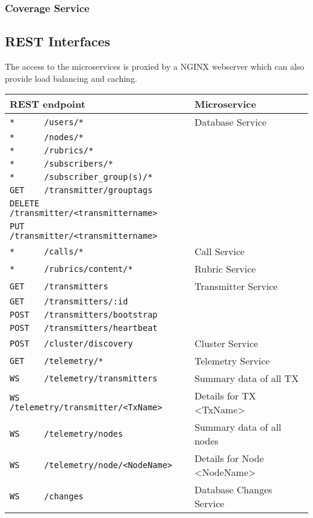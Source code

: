 \subsubsection{Coverage Service}
\label{internalprog:microservices:overview:coverage}




\subsection{REST Interfaces}
The access to the microservices is proxied by a NGINX webserver which can also provide load balancing and caching.

\begin{center}
  \begin{tabular}{|l|l|} \hline
    REST endpoint & Microservice \\ \hline \hline

    \verb|*      /users/*| & Database Service \\
    \verb|*      /nodes/*| &  \\
    \verb|*      /rubrics/*| &  \\
    \verb|*      /subscribers/*| & \\
    \verb|*      /subscriber_group(s)/*| & \\
    \verb|GET    /transmitter/grouptags | & \\
    \verb|DELETE /transmitter/<transmittername>| & \\
    \verb|PUT    /transmitter/<transmittername>| & \\ \hline

    \verb|*      /calls/*| & Call Service \\ \hline

    \verb|*      /rubrics/content/*| & Rubric Service \\ \hline

    \verb|GET    /transmitters| & Transmitter Service \\
    \verb|GET    /transmitters/:id| & \\
    \verb|POST   /transmitters/bootstrap| & \\
    \verb|POST   /transmitters/heartbeat| & \\ \hline

    \verb|POST   /cluster/discovery| & Cluster Service \\ \hline

    \verb|GET    /telemetry/*| & Telemetry Service \\ \hline
    \verb|WS     /telemetry/transmitters| & Summary data of all TX\\
    \verb|WS     /telemetry/transmitter/<TxName>| & Details for TX <TxName>\\
    \verb|WS     /telemetry/nodes| & Summary data of all nodes\\
    \verb|WS     /telemetry/node/<NodeName>| & Details for Node <NodeName>\\ \hline
    \verb|WS     /changes| & Database Changes Service \\ \hline


\end{tabular}
\end{center}
